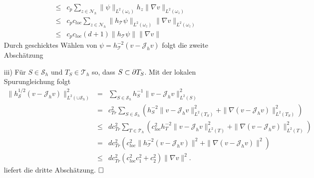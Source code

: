 \begin{itemize}
\begin{eqnarray*}
	 &\leq&c_p \sum_{z\in \mathscr{N}_h}\|\psi\|_{L^2(\omega_z)}h_z\|\nabla v\|_{L^2(\omega_z)}\\
	 &\leq&c_pc_{loc}\sum_{z\in \mathscr{N}_h}\|h_{\mathscr{T}}\psi\|_{L^2(\omega_z)}\|\nabla v\|_{L^2(\omega_z)}\\
	  &\leq&c_pc_{loc}(d+1)\|h_{\mathscr{T}}\psi\|\|\nabla v\|
\end{eqnarray*}
Durch geschicktes Wählen von $\psi = h_{\mathscr{T}}^{-2}(v-\mathscr{J}_hv)$ folgt die zweite Abschätzung
\item[iii)]
Für $S\in\mathscr{S}_h$ und $T_S\in\mathscr{T}_h$ so, dass $S\subset\partial T_S$. Mit der lokalen Spurungleichung folgt
\begin{eqnarray*}
	\|h_{\mathscr{S}}^{1/2}(v-\mathscr{J}_hv)\|^2_{L^2(\cup \mathscr{S}_h)} &=& \sum_{S\in\mathscr{S}_h} h_S^{-1}\|v-\mathscr{J}_hv\|^2_{L^2(S)}\\
	 &=&c^2_{Tr} \sum_{S\in\mathscr{S}_h} (h_S^{-2}\|v-\mathscr{J}_hv\|^2_{L^2(T_S)} +
	 \|\nabla (v-\mathscr{J}_hv)\|^2_{L^2(T_S)})\\
	 &\leq&dc^2_{Tr} \sum_{T\in\mathscr{T}_h} (c_{loc}^2h_T^{-2}\|v-\mathscr{J}_hv\|^2_{L^2(T)} + \|\nabla (v-\mathscr{J}_hv)\|^2_{L^2(T)})\\
	 &=&dc^2_{Tr} (c_{loc}^2\|h_{\mathscr{T}}^{-2}(v-\mathscr{J}_hv)\|^2+ \|\nabla (v-\mathscr{J}_hv)\|^2)\\
	 &\leq&dc^2_{Tr}(c_{loc}^2c_1^2+c_2^2)\|\nabla v\|^2.
\end{eqnarray*}
liefert die dritte Abschätzung.
$\hfill \Box$
\end{itemize}
